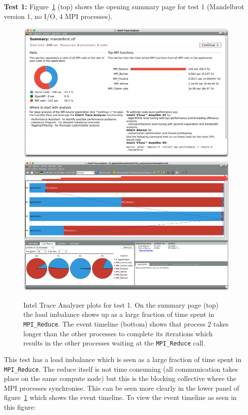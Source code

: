 \documentclass[a4paper,titlepage]{article}
\begin{document}
\noindent
\textbf{Test 1:} 
Figure~\ref{fig:test1_ITAC_summary} (top) shows the opening summary page for test 1 (Mandelbrot version 1, no I/O, 4 MPI processes).
\begin{figure}[htbp]
\begin{center}
\includegraphics[scale=0.3]{figures/test1_summary}
\includegraphics[scale=0.3]{figures/test1_eventTimeline}
\caption{Intel Trace Analyzer plots for test 1. On the summary page (top) the load imbalance shows up as a large fraction of time spent in \texttt{MPI\_Reduce}. The event timeline (bottom) shows that process 2 takes longer than the other processes to complete its iterations which results in the other processes waiting at the \texttt{MPI\_Reduce} call.}
\label{fig:test1_ITAC_summary}
\end{center}
\end{figure}
This test has a load imbalance which is seen as a large fraction of time spent in \texttt{MPI\_Reduce}. The reduce itself is not time consuming (all communication takes place on the same compute node) but this is the blocking collective where the MPI processes synchronise. This can be seen more clearly in the lower panel of figure~\ref{fig:test1_ITAC_summary} which shows the event timeline. To view the event timeline as seen in this figure:
\end{document}
